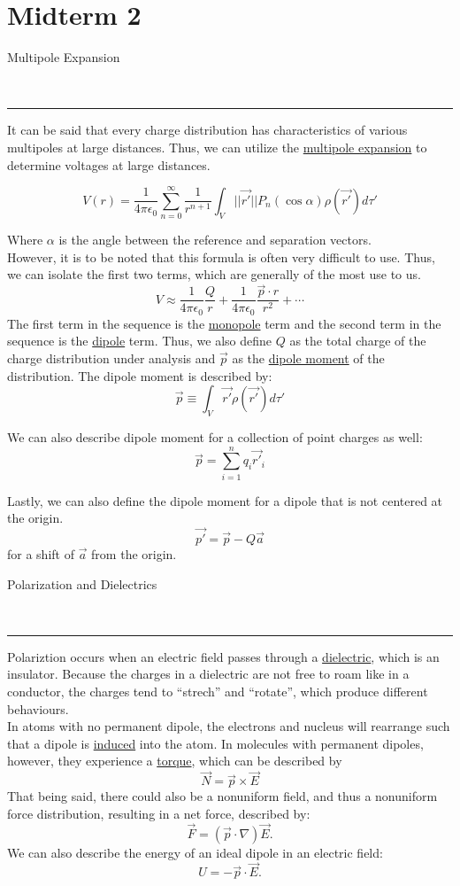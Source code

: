 \documentclass{article}
\newcommand{\header}[1]{\begin{large}\noindent #1\end{large}\\\rule{\textwidth}{0.5pt}}
\newcommand{\gap}{\medskip\\}
\begin{document}
\pagebreak

\section*{Midterm 2}

\header{Multipole Expansion}

It can be said that every charge distribution has characteristics of 
various multipoles at large distances. Thus, we can utilize the \underline{multipole expansion}
to determine voltages at large distances.

\[
    V(r) = \frac{1}{4\pi \epsilon_0}\sum_{n = 0}^\infty \frac{1}{r^{n + 1}} \int_{V} ||\vec{r'}|| P_n(\cos \alpha)\rho(\vec{r'})d\tau'   
\]

Where $\alpha$ is the angle between the reference and separation vectors.
\gap
However, it is to be noted that this formula is often very difficult to use. Thus,
we can isolate the first two terms, which are generally of the most use to us.
\[
    V \approx \frac{1}{4\pi\epsilon_0}\frac{Q}{r} + \frac{1}{4\pi \epsilon_0} \frac{\vec{p} \cdot \hat{r}}{r^2} + \cdots
\]
The first term in the sequence is the \underline{monopole} term and the second term in 
the sequence is the \underline{dipole} term. Thus, we also define $Q$ as the total charge
of the charge distribution under analysis and $\vec{p}$ as the \underline{dipole moment} 
of the distribution. The dipole moment is described by:
\[
    \vec{p} \equiv \int_V \vec{r'}\rho(\vec{r'})d\tau'   
\]

We can also describe dipole moment for a collection of point charges as well:
\[
    \vec{p} = \sum_{i = 1}^n q_i \vec{r'}_i    
\]

Lastly, we can also define the dipole moment for a dipole that is not centered at the origin.
\[
    \vec{p'} = \vec{p} - Q\vec{a}  
\]
for a shift of $\vec{a}$ from the origin.
\gap
\header{Polarization and Dielectrics}

Polariztion occurs when an electric field passes through a \underline{dielectric}, which
is an insulator. Because the charges in a dielectric are not free to roam like in a 
conductor, the charges tend to ``strech'' and ``rotate'', which produce different behaviours.
\gap
In atoms with no permanent dipole, the electrons and nucleus will rearrange such that a 
dipole is \underline{induced} into the atom. In molecules with permanent dipoles, however,
they experience a \underline{torque}, which can be described by 
\[
    \vec{N} = \vec{p} \times \vec{E}    
\]
That being said, there could also be a nonuniform field, and thus a nonuniform force distribution,
resulting in a net force, described by:
\[
    \vec{F} = (\vec{p} \cdot \nabla)\vec{E}.   
\]
We can also describe the energy of an ideal dipole in an electric field:
\[
    U = -\vec{p} \cdot \vec{E}.    
\]
\end{document}
